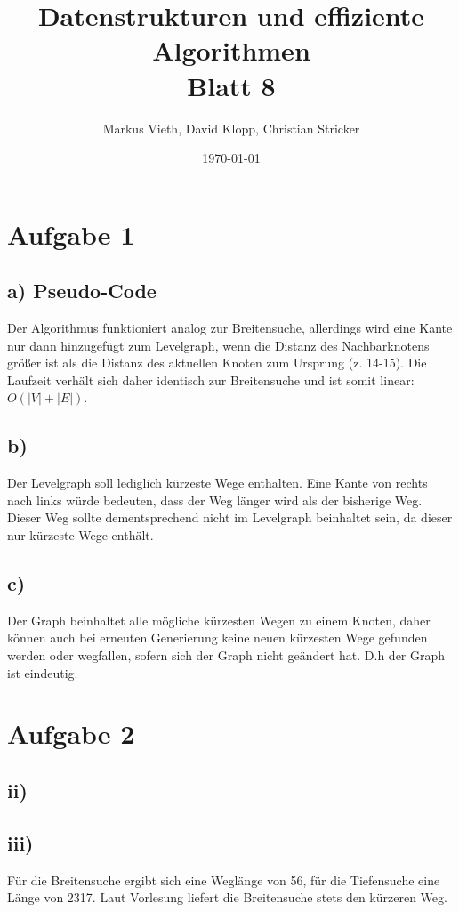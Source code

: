 \documentclass[a4paper,11pt,twoside]{article}
\title{Datenstrukturen und effiziente Algorithmen\\ Blatt 8}
\author{Markus Vieth, David Klopp, Christian Stricker}
\date{\today}
\begin{document}
\maketitle
\cleardoublepage
\pagestyle{myheadings}

\section*{Aufgabe 1}
\subsection*{a) Pseudo-Code}

Der Algorithmus funktioniert analog zur Breitensuche, allerdings wird eine Kante nur dann hinzugefügt zum Levelgraph, wenn die Distanz des Nachbarknotens größer ist als die Distanz des aktuellen Knoten zum Ursprung (z. 14-15). Die Laufzeit verhält sich daher identisch zur Breitensuche und ist somit linear: $O(|V| + |E|)$.

\subsection*{b)}
Der Levelgraph soll lediglich kürzeste Wege enthalten. Eine Kante von rechts nach links würde bedeuten, dass der Weg länger wird als der bisherige Weg. Dieser Weg sollte dementsprechend nicht im Levelgraph beinhaltet sein, da dieser nur kürzeste Wege enthält.

\subsection*{c)}
Der Graph beinhaltet alle mögliche kürzesten Wegen zu einem Knoten, daher können auch bei erneuten Generierung keine neuen kürzesten Wege gefunden werden oder wegfallen, sofern sich der Graph nicht geändert hat. D.h der Graph ist eindeutig. 

\pagebreak

\section*{Aufgabe 2}
\subsection*{ii)}


\subsection*{iii)}
Für die Breitensuche ergibt sich eine Weglänge von 56, für die Tiefensuche eine Länge von 2317. Laut Vorlesung liefert die Breitensuche stets den kürzeren Weg. 
\end{document}
